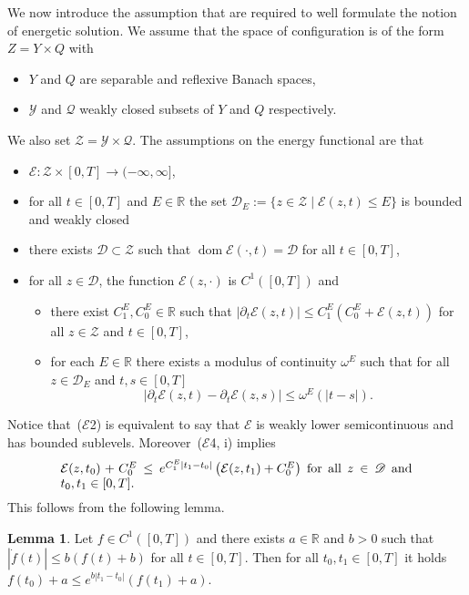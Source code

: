\documentclass[a4paper,10pt,twoside]{amsbook}
\numberwithin{section}{chapter}
\numberwithin{equation}{chapter}
\theoremstyle{definition}
\newtheorem{lemma}[prop]{Lemma}
\DeclareMathOperator{\dom}{dom}
\begin{document}
We now introduce the assumption that are required to well formulate the notion of energetic solution. We assume that the space of configuration is of the form $Z=Y\times Q$ with
\begin{itemize}[itemsep=0.5em]
\item[(Z1)] $Y$ and $Q$ are separable and reflexive Banach spaces,
\item[(Z2)] $\mathscr{Y}$ and $\mathscr{Q}$ weakly closed subsets of $Y$ and $Q$ respectively.
\end{itemize}
We also set $\mathscr{Z}=\mathscr{Y}\times\mathscr{Q}$. The assumptions on the energy functional are that
\begin{itemize}[itemsep=0.5em]
\item[($\mathcal{E}$1)] $\mathcal{E}\colon\mathscr{Z}\times[0,T]\to(-\infty,\infty]$,
\item[($\mathcal{E}$2)] for all $t\in[0,T]$ and $E\in\mathbb{R}$ the set $\mathscr{D}_E:=\{z\in\mathscr{Z}\;|\;\mathcal{E}(z,t)\le E\}$ is bounded and weakly closed
\item[($\mathcal{E}$3)] there exists $\mathscr{D}\subset\mathscr{Z}$ such that $\dom\mathcal{E}(\cdot,t)=\mathscr{D}$ for all $t\in[0,T]$,
\item[($\mathcal{E}$4)] for all $z\in\mathscr{D}$, the function $\mathcal{E}(z,\cdot)$ is $C^1([0,T])$ and
\begin{itemize}
\item[(i)] there exist $C_1^E,C_0^E\in\mathbb{R}$ such that $|\partial_t\mathcal{E}(z,t)|\le C_1^E(C_0^E+\mathcal{E}(z,t))$ for all $z\in\mathscr{Z}$ and $t\in[0,T]$,
\item[(ii)] for each $E\in\mathbb{R}$ there exists a modulus of continuity $\omega^E$ such that for all $z\in\mathscr{D}_E$ and $t,s\in[0,T]$
\[
|\partial_t\mathcal{E}(z,t)-\partial_t\mathcal{E}(z,s)|\le\omega^E(|t-s|).
\]
\end{itemize}
\end{itemize}
Notice that~($\mathcal{E}$2) is equivalent to say that $\mathcal{E}$ is weakly lower semicontinuous and has bounded sublevels. Moreover~($\mathcal{E}$4, i) implies
\begin{equation}
\label{eqn:ES-gronwall}
\parbox[c]{0.8\textwidth}{$\mathcal{E}(z,t_0)+C_0^E\le e^{C_1^E|t_1-t_0|}\left(\mathcal{E}(z,t_1)+C_0^E\right)$ for all $z\in\mathscr{D}$ and $t_0,t_1\in[0,T]$.}
\end{equation}
This follows from the following lemma.
\begin{lemma}
Let $f\in C^1([0,T])$ and there exists $a\in\mathbb{R}$ and $b>0$ such that
$|\dot{f}(t)|\le b(f(t)+b)$ for all $t\in[0,T]$. Then for all $t_0,t_1\in[0,T]$ it holds $f(t_0)+a\le e^{b|t_1-t_0|}(f(t_1)+a)$.
\end{lemma}
\end{document}
